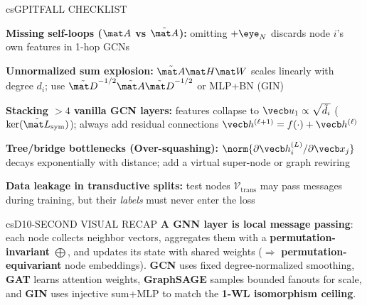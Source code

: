 \documentclass[../../../../master.tex]{subfiles}
\begin{document}
\begin{cscolumns}
\begin{cscard}{csG}{PITFALL CHECKLIST}
  \begin{csbul}
    \item \textbf{Missing self-loops ($\mat A$ vs $\tilde{\mat A}$):} omitting $+\eye_N$ discards node $i$'s own features in 1-hop GCNs
    \item \textbf{Unnormalized sum explosion:} $\tilde{\mat A}\mat H\mat W$ scales linearly with degree $d_i$; use $\tilde{\mat D}^{-1/2}\tilde{\mat A}\tilde{\mat D}^{-1/2}$ or MLP+BN (GIN)
    \item \textbf{Stacking $>4$ vanilla GCN layers:} features collapse to $\vecb u_1 \propto \sqrt{\tilde d_i}$ ($\ker(\tilde{\mat L}_{\mathrm{sym}})$); always add residual connections $\vecb h^{(\ell+1)} = f(\cdot)+\vecb h^{(\ell)}$
    \item \textbf{Tree/bridge bottlenecks (Over-squashing):} $\norm{\partial\vecb h_i^{(L)}/\partial\vecb x_j}$ decays exponentially with distance; add a virtual super-node or graph rewiring
    \item \textbf{Data leakage in transductive splits:} test nodes $\mathcal V_{\mathrm{trans}}$ may pass messages during training, but their \emph{labels} must never enter the loss
  \end{csbul}
\end{cscard}

\begin{cscard}{csD}{10-SECOND VISUAL RECAP}
  \sffamily\footnotesize
  \textbf{A GNN layer is local message passing}: each node collects neighbor vectors, aggregates them with a \textbf{permutation-invariant} $\bigoplus$, and updates its state with shared weights ($\Rightarrow$ \textbf{permutation-equivariant} node embeddings). \textbf{GCN} uses fixed degree-normalized smoothing, \textbf{GAT} learns attention weights, \textbf{GraphSAGE} samples bounded fanouts for scale, and \textbf{GIN} uses injective sum+MLP to match the \textbf{1-WL isomorphism ceiling}.
\end{cscard}
\end{cscolumns}

\csend
\end{document}
